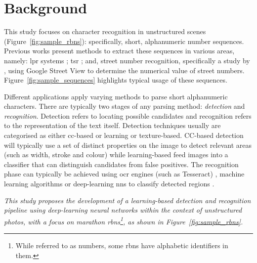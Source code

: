 \section{Background}
\label{sec:introduction:background}

This study focuses on character recognition in unstructured scenes (Figure~\ref{fig:sample_rbns}): specifically, short, alphanumeric number sequences. Previous works present methods to extract these sequences in various areas, namely: \gls{lpr} systems \citep{CanoPerez:2003fq,Anagnostopoulos:2006wv}; \gls{tsr} \citep{Eichner:2008dw,Kundu:2015vq,Seo:2015ez, Lian:2016dc}; and, street number recognition, specifically a study by \citet{Netzer:2011to}, using Google Street View to determine the numerical value of street numbers. Figure~\ref{fig:sample_sequences} highlights typical usage of these sequences.

Different applications apply varying methods to parse short alphanumeric characters. There are typically two stages of any parsing method: \textit{detection} and \textit{recognition}. Detection refers to locating possible candidates and recognition refers to the representation of the text itself. Detection techniques usually are categorised as either \gls{cc}-based or learning or texture-based. CC-based detection will typically use a set of distinct properties on the image to detect relevant areas (such as width, stroke and colour) while learning-based feed images into a classifier that can distinguish candidates from false positives. The recognition phase can typically be achieved using \gls{ocr} engines (such as Tesseract) \citep{Benami:2012jf}, machine learning algorithms \citep{Kundu:2015vq, Netzer:2011to, Lee:1994jz} or deep-learning \glspl{nn} to classify detected regions \citep{Sermanet:2011ui, Lian:2016dc, Jin:2014jn}.

{
  \itshape
  This study proposes the development of a learning-based detection and recognition pipeline using deep-learning neural networks within the context of unstructured photos, with a focus on marathon \glspl{rbn}\footnote{While referred to as numbers, some \glspl{rbn} have alphabetic identifiers in them.}, as shown in Figure~\ref{fig:sample_rbns}.
}


